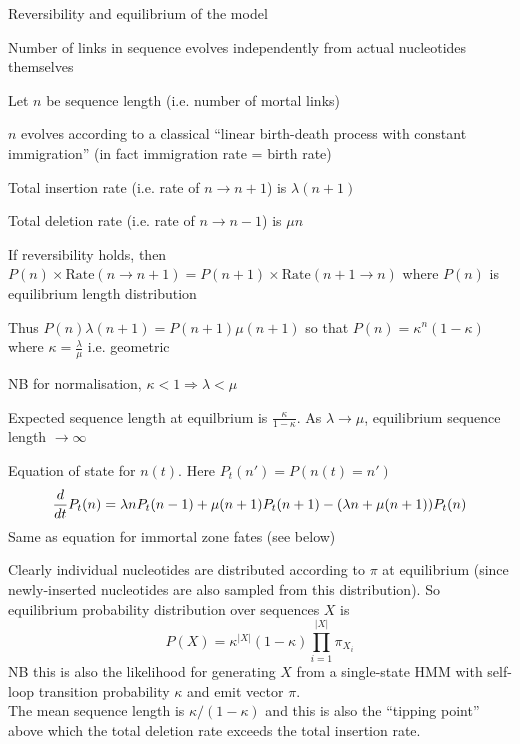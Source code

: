 \documentclass{beamer}
\begin{document}
\begin{frame}{}
\itemb
\item Reversibility and equilibrium of the model
 \itemb
 \item Number of links in sequence evolves independently from actual nucleotides themselves
 \item Let $n$ be sequence length (i.e. number of mortal links)
  \itemb
  \item $n$ evolves according to a classical ``linear birth-death process with constant immigration'' (in fact immigration rate = birth rate)
  \item Total insertion rate (i.e. rate of $n \to n+1$) is $\lambda (n+1)$
  \item Total deletion rate (i.e. rate of $n \to n-1$) is $\mu n$
  \item If reversibility holds, then $P(n) \times \mbox{Rate}(n \to n+1) = P(n+1) \times \mbox{Rate}(n+1 \to n)$ where $P(n)$ is equilibrium length distribution
  \item Thus $P(n) \lambda(n+1) = P(n+1) \mu(n+1)$ so that $P(n) = \kappa^n (1-\kappa)$ where $\kappa = \frac{\lambda}{\mu}$ i.e. geometric
  \item NB for normalisation, $\kappa < 1 \Rightarrow \lambda < \mu$
  \item Expected sequence length at equilbrium is $\frac{\kappa}{1-\kappa}$. As $\lambda \to \mu$, equilibrium sequence length $\to \infty$
  \item Equation of state for $n(t)$. Here $P_t(n') = P(n(t)=n')$
\[
\frac{d}{d {t}} P_t(n) = \lambda n P_t(n-1) + \mu (n+1) P_t(n+1) - (\lambda n + \mu (n+1)) P_t(n)
\]
Same as equation for immortal zone fates (see below)
  \iteme
 \item Clearly individual nucleotides are distributed according to $\pi$ at equilibrium
(since newly-inserted nucleotides are also sampled from this distribution).
So equilibrium probability distribution over sequences $X$ is
\[
P(X) = \kappa^{|X|} (1-\kappa) \prod_{i=1}^{|X|} \pi_{X_i}
\]
NB this is also the likelihood for generating $X$ from a single-state HMM with self-loop transition probability $\kappa$ and emit vector $\pi$.
\\
The mean sequence length is $\kappa/(1-\kappa)$ and this is also the ``tipping point'' above which the total deletion rate exceeds the total insertion rate.
 \iteme
\iteme
\end{frame}
\end{document}
